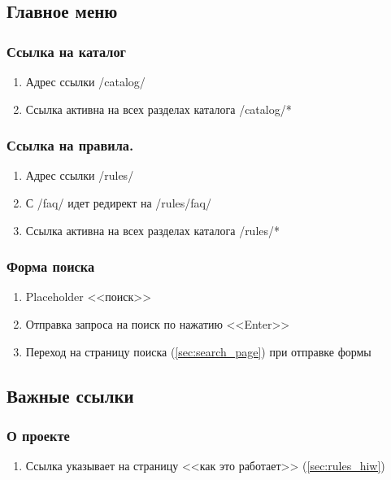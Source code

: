         \subsection{Главное меню}
            \label{sec:baseitems_main_meu}
            \subsubsection{Ссылка на каталог}
                \begin{enumerate}
                    \item Адрес ссылки /catalog/
                    \item Ссылка активна на всех разделах каталога /catalog/*
                \end{enumerate}
            \subsubsection{Ссылка на правила.}
                \begin{enumerate}
                    \item Адрес ссылки /rules/
                    \item С /faq/ идет редирект на /rules/faq/
                    \item Ссылка активна на всех разделах каталога /rules/*
                \end{enumerate}
            
            \subsubsection{Форма поиска}
                \begin{enumerate}
                    \item Placeholder <<поиск>>
                    \item Отправка запроса на поиск по нажатию <<Enter>>
                    \item Переход на страницу поиска (\ref{sec:search_page}) при отправке формы
                \end{enumerate}
        \subsection{Важные ссылки}
            \label{sec:baseitems_important_links}
            \subsubsection{О проекте}
                \begin{enumerate}
                    \item Ссылка указывает на страницу <<как это работает>> (\ref{sec:rules_hiw})
                \end{enumerate}
